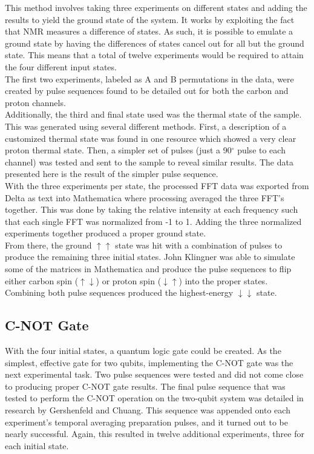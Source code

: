 \documentclass[11pt]{article}
\newcommand{\super}[1]{\ensuremath{^{\textrm{#1}}}}
\begin{document}
\begin{multicols}{2}
This method involves taking three experiments on different states and adding the results to yield the ground state of the system. It works by exploiting the fact that NMR measures a difference of states. As such, it is possible to emulate a ground state by having the differences of states cancel out for all but the ground state. This means that a total of twelve experiments would be required to attain the four different input states.\cite{tempavg} \\

The first two experiments, labeled as A and B permutations in the data, were created by pulse sequences found to be detailed out for both the carbon and proton channels.\cite{tempavg} \\

Additionally, the third and final state used was the thermal state of the sample. This was generated using several different methods. First, a description of a customized thermal state was found in one resource which showed a very clear proton thermal state. Then, a simpler set of pulses (just a 90\super{$\circ$} pulse to each channel) was tested and sent to the sample to reveal similar results. The data presented here is the result of the simpler pulse sequence. \\

With the three experiments per state, the processed FFT data was exported from Delta as text into Mathematica where processing averaged the three FFT's together. This was done by taking the relative intensity at each frequency such that each single FFT was normalized from -1 to 1.\cite{tempavg} Adding the three normalized experiments together produced a proper ground state. \\

From there, the ground $\uparrow\uparrow$ state was hit with a combination of pulses to produce the remaining three initial states. John Klingner was able to simulate some of the matrices in Mathematica and produce the pulse sequences to flip either carbon spin ($\uparrow\downarrow$) or proton spin ($\downarrow\uparrow$) into the proper states. Combining both pulse sequences produced the highest-energy $\downarrow\downarrow$ state.


  \subsection{C-NOT Gate}
  With the four initial states, a quantum logic gate could be created. As the simplest, effective gate for two qubits,\cite{lnmr,mit-lab,c-not} implementing the C-NOT gate was the next experimental task. Two pulse sequences were tested and did not come close to producing proper C-NOT gate results.\cite{lnmr} The final pulse sequence that was tested to perform the C-NOT operation on the two-qubit system was detailed in research by Gershenfeld and Chuang.\cite{c-not} This sequence was appended onto each experiment's temporal averaging preparation pulses, and it turned out to be nearly successful. Again, this resulted in twelve additional experiments, three for each initial state.


\end{multicols}
\end{document}
